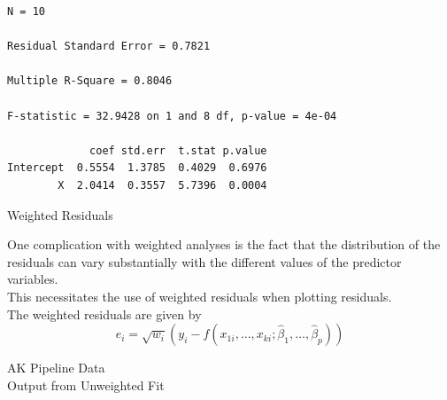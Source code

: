 {{{\begin{verbatim}
N = 10

Residual Standard Error = 0.7821

Multiple R-Square = 0.8046

F-statistic = 32.9428 on 1 and 8 df, p-value = 4e-04

             coef std.err  t.stat p.value 
Intercept  0.5554  1.3785  0.4029  0.6976
        X  2.0414  0.3557  5.7396  0.0004 
\end{verbatim}
}
%
%
%
%
%
\clearpage
\newpage
\begin{figure}
\end{figure}
\begin{figure}
\end{figure}
\clearpage
\newpage
\begin{center}
Weighted Residuals
\end{center}
\vspace{0.5in}
One complication with weighted analyses is the
fact that the distribution of the residuals can 
vary substantially with the different values of the 
predictor variables. \\
\vspace{0.5in}
This necessitates the use of weighted residuals when
plotting residuals. \\
\vspace{0.5in}
The weighted residuals are given by
\[ e_i = \sqrt{w_i}(y_i-f(x_{1i},\ldots,x_{ki};\hat{\beta}_1,\ldots,\hat{\beta}_p)) \]
\clearpage
\begin{figure}
\end{figure}
\begin{figure}
\end{figure}
\begin{figure}
\end{figure}
\begin{figure}
\end{figure}
\begin{figure}
\end{figure}
\clearpage
\newpage
\begin{center}
AK Pipeline Data \\
Output from  Unweighted Fit
\end{center}
\vspace{0.5in}
{\large
\begin{verbatim}


\end{verbatim}}}}
